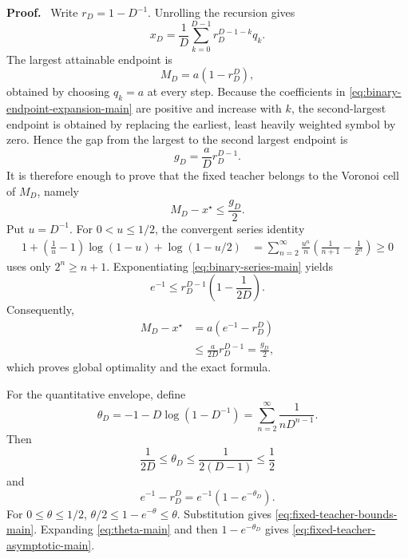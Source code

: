 \documentclass[twoside,11pt]{article}
\renewenvironment{proof}[1][Proof]{\par\noindent\textbf{#1.}\ }{\hfill\BlackBox\par\medskip}
\begin{document}
\begin{proof}
Write $r_D=1-D^{-1}$.  Unrolling the recursion gives
\begin{equation}
 x_D=\frac1D\sum_{k=0}^{D-1}r_D^{D-1-k}q_k.
 \label{eq:binary-endpoint-expansion-main}
\end{equation}
The largest attainable endpoint is
\begin{equation}
 M_D=a(1-r_D^D),
 \label{eq:binary-largest-main}
\end{equation}
obtained by choosing $q_k=a$ at every step.  Because the coefficients in \eqref{eq:binary-endpoint-expansion-main} are positive and increase with $k$, the second-largest endpoint is obtained by replacing the earliest, least heavily weighted symbol by zero.  Hence the gap from the largest to the second largest endpoint is
\begin{equation}
 g_D=\frac{a}{D}r_D^{D-1}.
 \label{eq:binary-top-gap-main}
\end{equation}
It is therefore enough to prove that the fixed teacher belongs to the Voronoi cell of $M_D$, namely
\begin{equation}
 M_D-x^\star\le \frac{g_D}{2}.
 \label{eq:binary-voronoi-condition-main}
\end{equation}
Put $u=D^{-1}$.  For $0<u\le1/2$, the convergent series identity
\begin{align}
 1+\left(\frac1u-1\right)\log(1-u)+\log(1-u/2)
 &=\sum_{n=2}^{\infty}\frac{u^n}{n}
   \left(\frac1{n+1}-\frac1{2^n}\right)
 \ge0
 \label{eq:binary-series-main}
\end{align}
uses only $2^n\ge n+1$.  Exponentiating \eqref{eq:binary-series-main} yields
\begin{equation}
 e^{-1}\le r_D^{D-1}\left(1-\frac1{2D}\right).
 \label{eq:binary-exponential-ineq-main}
\end{equation}
Consequently,
\begin{align}
 M_D-x^\star
 &=a(e^{-1}-r_D^D) \\
 &\le \frac{a}{2D}r_D^{D-1}
 =\frac{g_D}{2},
 \label{eq:binary-voronoi-proof-main}
\end{align}
which proves global optimality and the exact formula.

For the quantitative envelope, define
\begin{equation}
 \theta_D=-1-D\log(1-D^{-1})
 =\sum_{n=2}^{\infty}\frac1{nD^{n-1}}.
 \label{eq:theta-main}
\end{equation}
Then
\begin{equation}
 \frac1{2D}\le\theta_D\le\frac1{2(D-1)}\le\frac12
 \label{eq:theta-bounds-main}
\end{equation}
and
\begin{equation}
 e^{-1}-r_D^D=e^{-1}(1-e^{-\theta_D}).
 \label{eq:theta-error-main}
\end{equation}
For $0\le\theta\le1/2$, $\theta/2\le1-e^{-\theta}\le\theta$.  Substitution gives \eqref{eq:fixed-teacher-bounds-main}.  Expanding \eqref{eq:theta-main} and then $1-e^{-\theta_D}$ gives \eqref{eq:fixed-teacher-asymptotic-main}.
\end{proof}
\end{document}
